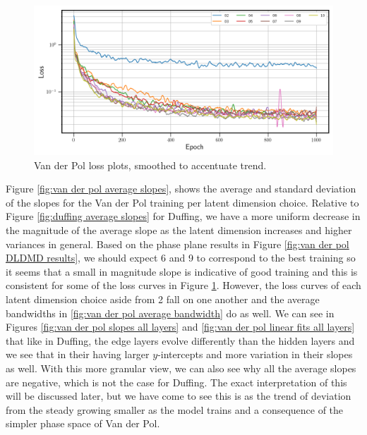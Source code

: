\begin{figure}[ht]
    \centering
    \begin{minipage}{\textwidth}
        \includegraphics[width=\textwidth]{"../Figures/van_der_pol_loss_plots.png"} 
    \end{minipage}
    \caption{Van der Pol loss plots, smoothed to accentuate trend.}
    \label{fig:van der pol losses}
\end{figure}

Figure \ref{fig:van der pol average slopes}, shows the average and standard deviation of the slopes for 
the Van der Pol training per latent dimension choice. Relative to Figure \ref{fig:duffing average slopes}
for Duffing, we have a more uniform decrease in the magnitude of the average slope as the latent dimension 
increases and higher variances in general. Based on the phase plane results in Figure \ref{fig:van der pol DLDMD results}, 
we should expect 6 and 9 to correspond to the best training so it seems that a small in magnitude slope is indicative 
of good training and this is consistent for some of the loss curves in Figure \ref{fig:van der pol losses}. 
However, the loss curves of each latent dimension choice aside from 2 fall on one another and the average
bandwidths in \ref{fig:van der pol average bandwidth} do as well. We can see in Figures \ref{fig:van der pol slopes all layers}
and \ref{fig:van der pol linear fits all layers} that like in Duffing, the edge layers evolve differently 
than the hidden layers and we see that in their having larger $y$-intercepts and more variation in their 
slopes as well. With this more granular view, we can also see why all the average slopes are negative,
which is not the case for Duffing. The exact interpretation of this will be discussed later, but we have come 
to see this is as the trend of deviation from the steady growing smaller as the model trains and a consequence 
of the simpler phase space of Van der Pol.

